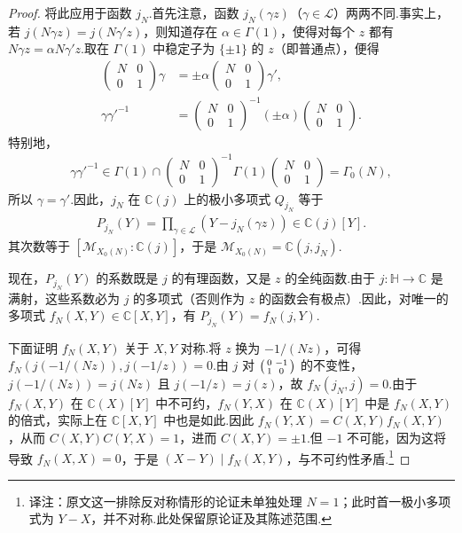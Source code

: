 \begin{proof}
将此应用于函数 $j_N$.首先注意，函数 $j_N(\gamma z)$（$\gamma\in\mathcal L$）两两不同.事实上，若 $j(N\gamma z)=j(N\gamma'z)$，则知道存在 $\alpha\in\Gamma(1)$，使得对每个 $z$ 都有 $N\gamma z=\alpha N\gamma'z$.取在 $\Gamma(1)$ 中稳定子为 $\{\pm1\}$ 的 $z$（即普通点），便得
\begin{align*}
\begin{pmatrix}N&0\\0&1\end{pmatrix}\gamma
&=\pm\alpha\begin{pmatrix}N&0\\0&1\end{pmatrix}\gamma',\\
\gamma\gamma'^{-1}
&=\begin{pmatrix}N&0\\0&1\end{pmatrix}^{-1}(\pm\alpha)\begin{pmatrix}N&0\\0&1\end{pmatrix}.
\end{align*}
特别地，
\begin{align*}
\gamma\gamma'^{-1}\in\Gamma(1)\cap\begin{pmatrix}N&0\\0&1\end{pmatrix}^{-1}\Gamma(1)\begin{pmatrix}N&0\\0&1\end{pmatrix}=\Gamma_0(N),
\end{align*}
所以 $\gamma=\gamma'$.因此，$j_N$ 在 $\mathbb C(j)$ 上的极小多项式 $Q_{j_N}$ 等于
\begin{align*}
P_{j_N}(Y)=\prod_{\gamma\in\mathcal L}(Y-j_N(\gamma z))\in\mathbb C(j)[Y].
\end{align*}
其次数等于 $[\mathcal M_{X_0(N)}:\mathbb C(j)]$，于是 $\mathcal M_{X_0(N)}=\mathbb C(j,j_N)$.



现在，$P_{j_N}(Y)$ 的系数既是 $j$ 的有理函数，又是 $z$ 的全纯函数.由于 $j:\mathbb H\longrightarrow\mathbb C$ 是满射，这些系数必为 $j$ 的多项式（否则作为 $z$ 的函数会有极点）.因此，对唯一的多项式 $f_N(X,Y)\in\mathbb C[X,Y]$，有 $P_{j_N}(Y)=f_N(j,Y)$.



下面证明 $f_N(X,Y)$ 关于 $X,Y$ 对称.将 $z$ 换为 $-1/(Nz)$，可得 $f_N(j(-1/(Nz)),j(-1/z))=0$.由 $j$ 对 $\begin{psmallmatrix}0&-1\\1&0\end{psmallmatrix}$ 的不变性，$j(-1/(Nz))=j(Nz)$ 且 $j(-1/z)=j(z)$，故 $f_N(j_N,j)=0$.由于 $f_N(X,Y)$ 在 $\mathbb C(X)[Y]$ 中不可约，$f_N(Y,X)$ 在 $\mathbb C(X)[Y]$ 中是 $f_N(X,Y)$ 的倍式，实际上在 $\mathbb C[X,Y]$ 中也是如此.因此 $f_N(Y,X)=C(X,Y)f_N(X,Y)$，从而 $C(X,Y)C(Y,X)=1$，进而 $C(X,Y)=\pm1$.但 $-1$ 不可能，因为这将导致 $f_N(X,X)=0$，于是 $(X-Y)\mid f_N(X,Y)$，与不可约性矛盾.\footnote{译注：原文这一排除反对称情形的论证未单独处理 $N=1$；此时首一极小多项式为 $Y-X$，并不对称.此处保留原论证及其陈述范围.}




\end{proof}

